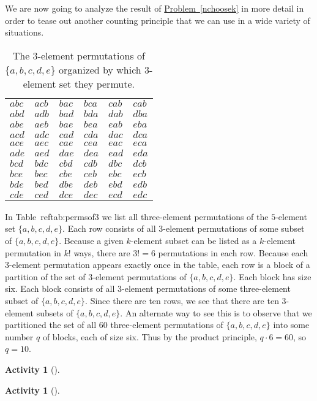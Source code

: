 \documentclass[10pt,]{book}
\theoremstyle{plain}
\theoremstyle{definition}
\newtheorem{activity}[project]{Activity}
\numberwithin{equation}{chapter}
\begin{document}
We are now going to analyze the result of \hyperref[nchoosek]{Problem~\ref{nchoosek}} in more detail in order to tease out another counting principle that we can use in a wide variety of situations.%
\begin{table}
\centering
\begin{tabular}{llllll}
\(abc\)&\(acb\)&\(bac\)&\(bca\)&\(cab\)&\(cab\)\tabularnewline[0pt]
\(abd\)&\(adb\)&\(bad\)&\(bda\)&\(dab\)&\(dba\)\tabularnewline[0pt]
\(abe\)&\(aeb\)&\(bae\)&\(bea\)&\(eab\)&\(eba\)\tabularnewline[0pt]
\(acd\)&\(adc\)&\(cad\)&\(cda\)&\(dac\)&\(dca\)\tabularnewline[0pt]
\(ace\)&\(aec\)&\(cae\)&\(cea\)&\(eac\)&\(eca\)\tabularnewline[0pt]
\(ade\)&\(aed\)&\(dae\)&\(dea\)&\(ead\)&\(eda\)\tabularnewline[0pt]
\(bcd\)&\(bdc\)&\(cbd\)&\(cdb\)&\(dbc\)&\(dcb\)\tabularnewline[0pt]
\(bce\)&\(bec\)&\(cbe\)&\(ceb\)&\(ebc\)&\(ecb\)\tabularnewline[0pt]
\(bde\)&\(bed\)&\(dbe\)&\(deb\)&\(ebd\)&\(edb\)\tabularnewline[0pt]
\(cde\)&\(ced\)&\(dce\)&\(dec\)&\(ecd\)&\(edc\)
\end{tabular}
\caption{The \(3\)-element permutations of \(\{a,b,c,d,e\}\) organized by which \(3\)-element set they permute.\label{tab_permsof3}}
\end{table}
In Table~ref{tab:permsof3} we list all three-element permutations of the \(5\)-element set \(\{a,b,c,d,e\}\). Each row consists of all \(3\)-element permutations of some subset of \(\{a,b,c,d,e\}\). Because a given \(k\)-element subset can be listed as a \(k\)-element permutation in \(k!\) ways, there are \(3!=6\) permutations in each row. Because each \(3\)-element permutation appears exactly once in the table, each row is a block of a partition of the set of \(3\)-element permutations of \(\{a,b,c,d,e\}\). Each block has size six. Each block consists of all \(3\)-element permutations of some three-element subset of \(\{a,b,c,d,e\}\). Since there are ten rows, we see that there are ten \(3\)-element subsets of \(\{a,b,c,d,e\}\). An alternate way to see this is to observe that we partitioned the set of all \(60\) three-element permutations of \(\{a,b,c,d,e\}\) into some number \(q\) of blocks, each of size six. Thus by the product principle, \(q\cdot 6=60\), so \(q=10\).%
\begin{activity}[]\label{formulanchoosek}
\end{activity}
\begin{activity}[]\label{activity-40}
\end{activity}
\end{document}
